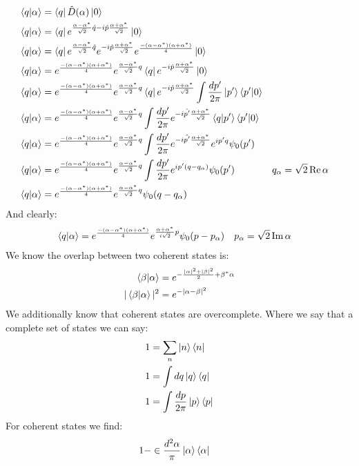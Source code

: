 \begin{align*}
	\bra{q}\ket{\alpha} &= \bra{q}\hat{D}(\alpha)\ket{0} \\
	\bra{q}\ket{\alpha} &= \bra{q}e^{\frac{\alpha - \alpha^*}{\sqrt{2}}\hat{q} - i\hat{p}\frac{\alpha + \alpha^*}{\sqrt{2}}}\ket{0} \\
	\bra{q}\ket{\alpha} &= \bra{q}e^{\frac{\alpha - \alpha^*}{\sqrt{2}}\hat{q}}e^{- i\hat{p}\frac{\alpha + \alpha^*}{\sqrt{2}}}e^\frac{-(\alpha - \alpha^*)(\alpha + \alpha^*)}{4}\ket{0} \\
	\bra{q}\ket{\alpha} &= e^\frac{-(\alpha - \alpha^*)(\alpha + \alpha^*)}{4}e^{\frac{\alpha - \alpha^*}{\sqrt{2}}q}\bra{q}e^{- i\hat{p}\frac{\alpha + \alpha^*}{\sqrt{2}}}\ket{0} \\
	\bra{q}\ket{\alpha} &= e^\frac{-(\alpha - \alpha^*)(\alpha + \alpha^*)}{4}e^{\frac{\alpha - \alpha^*}{\sqrt{2}}q}\bra{q}e^{- i\hat{p}\frac{\alpha + \alpha^*}{\sqrt{2}}}\int \frac{dp'}{2\pi}\ket{p'}\bra{p'}\ket{0} \\
	\bra{q}\ket{\alpha} &= e^\frac{-(\alpha - \alpha^*)(\alpha + \alpha^*)}{4}e^{\frac{\alpha - \alpha^*}{\sqrt{2}}q}\int \frac{dp'}{2\pi}e^{- i\hat{p'}\frac{\alpha + \alpha^*}{\sqrt{2}}}\bra{q}\ket{p'}\bra{p'}\ket{0} \\
	\bra{q}\ket{\alpha} &= e^\frac{-(\alpha - \alpha^*)(\alpha + \alpha^*)}{4}e^{\frac{\alpha - \alpha^*}{\sqrt{2}}q}\int \frac{dp'}{2\pi}e^{- i\hat{p'}\frac{\alpha + \alpha^*}{\sqrt{2}}}e^{ip'q}\psi_0(p') \\
	\bra{q}\ket{\alpha} &= e^\frac{-(\alpha - \alpha^*)(\alpha + \alpha^*)}{4}e^{\frac{\alpha - \alpha^*}{\sqrt{2}}q}\int \frac{dp'}{2\pi}e^{ip'(q-q_\alpha)}\psi_0(p') & q_\alpha &= \sqrt{2}\Re\alpha \\
	\bra{q}\ket{\alpha} &= e^\frac{-(\alpha - \alpha^*)(\alpha + \alpha^*)}{4}e^{\frac{\alpha - \alpha^*}{\sqrt{2}}q} \psi_0(q - q_\alpha)
\end{align*}
And clearly:
\begin{align*}
	\bra{q}\ket{\alpha} &= e^\frac{-(\alpha - \alpha^*)(\alpha + \alpha^*)}{4}e^{\frac{\alpha + \alpha^*}{i\sqrt{2}}p} \psi_0(p - p_\alpha) & p_\alpha &= \sqrt{2}\Im\alpha
\end{align*}
We know the overlap between two coherent states is:
\begin{align*}
	\bra{\beta}\ket{\alpha} &= e^{-\frac{|\alpha|^2 + |\beta|^2}{2} + \beta^*\alpha} \\
	|\bra{\beta}\ket{\alpha}|^2 &= e^{-|\alpha-\beta|^2}
\end{align*}
We additionally know that coherent states are overcomplete. Where we say that a complete set of states we can say:
\begin{align*}
	1 &= \sum_n \ket{n}\bra{n} \\
	1 &= \int dq \ket{q}\bra{q} \\
	1 &= \int \frac{dp}{2\pi} \ket{p}\bra{p}
\end{align*}
For coherent states we find:
\begin{align*}
	1 &- \in \frac{d^2\alpha}{\pi}\ket{\alpha}\bra{\alpha}
\end{align*}

